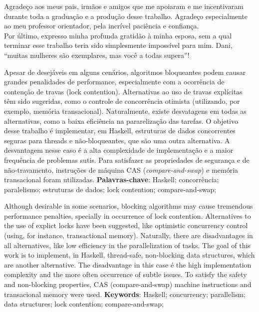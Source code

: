 \documentclass[a4paper,12pt,oldfontcommands]{abntex2}
\begin{document}
\begin{agradecimentos}
    \vspace*{\fill}
    \begin{flushright}
        Agradeço aos meus pais, irmãos e amigos que me apoiaram e me incentivaram durante toda a graduação e a produção desse trabalho. Agradeço especialmente ao meu professor orientador, pela incrível paciência e confiança.
        \\\vspace*{0.5cm}
        Por último, expresso minha profunda gratidão à minha esposa, sem a qual terminar esse trabalho teria sido simplesmente impossível para mim. Dani, ``muitas mulheres são exemplares, mas você a todas supera''!
    \end{flushright}
    \vspace*{\fill}
\end{agradecimentos}

\begin{resumo}
    Apesar de desejáveis em alguns cenários, algoritmos bloqueantes podem causar grandes penalidades de performance, especialmente com a ocorrência de contenção de travas (lock contention). Alternativas ao uso de travas explícitas têm sido sugeridas, como o controle de concorrência otimista (utilizando, por exemplo, memória transacional). Naturalmente, existe desvatagens em todas as alternativas, como a baixa eficiência na pararelização das tarefas.   O   objetivo   desse   trabalho   é   implementar,  em   Haskell,   estruturas   de   dados concorrentes seguras para threads e não-bloqueantes, que são uma outra alternativa. A desvantagem nesse caso é a alta complexidade de implementação e a maior frequência de problemas sutis. Para satisfazer as propriedades de segurança e de não-travamento, instruções de máquina CAS (\textit{compare-and-swap}) e memória transacional foram utilizadas.
    \hfill\break
    \hfill\break
    \noindent
    \textbf{Palavras-chave}: Haskell; concorrência; paralelismo; estruturas de dados; lock contention; compare-and-swap;
\end{resumo}

\begin{resumo}[Abstract]
Although desirable in some scenarios, blocking algorithms may cause tremendous performance penalties, specially in occurrence of lock contention. Alternatives to the use of explict locks have been suggested, like optimistic concurrency control (using, for instance, transactional memory). Naturally, there are disadvantages in all alternatives, like low efficiency in the parallelization of tasks. The goal of this work is to implement, in Haskell, thread-safe, non-blocking data structures, which are another alternative. The disadvantage in this case é the high implementation complexity and the more often occurrence of subtle issues. To satisfy the safety and non-blocking properties, CAS (compare-and-swap) machine instructions and transacional memory were used.
    \hfill\break
    \hfill\break
    \noindent
    \textbf{Keywords}: Haskell; concurrency; parallelism; data structures; lock contention; compare-and-swap;
\end{resumo}
\end{document}
